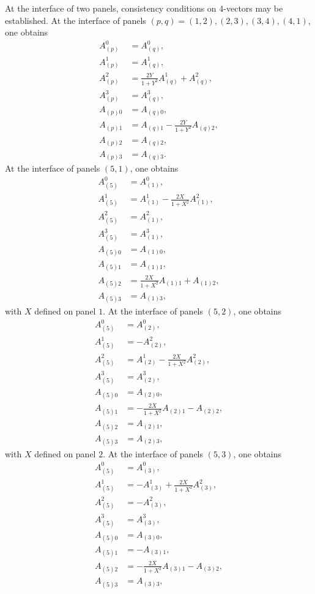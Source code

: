 \documentclass{article}
\begin{document}
At the interface of two panels, consistency conditions on 4-vectors may be established. At the interface of panels $(p,q)=(1,2), (2,3),(3,4),(4,1)$, one obtains
\begin{align}
A^0_{(p)}&=A^0_{(q)}, \\
A^1_{(p)}&=A^1_{(q)}, \\
A^2_{(p)}&=\frac{2Y}{1+Y^2} A^1_{(q)} + A^2_{(q)}, \\
A^3_{(p)}&=A^3_{(q)}, \\
A_{(p)0}&=A_{(q)0}, \\
A_{(p)1}&=A_{(q)1}-\frac{2Y}{1+Y^2} A_{(q)2}, \\
A_{(p)2}&=A_{(q)2}, \\
A_{(p)3}&=A_{(q)3}.
\end{align}
At the interface of panels $(5,1)$, one obtains
\begin{align}
A^0_{(5)}&=A^0_{(1)}, \\
A^1_{(5)}&=A^1_{(1)}-\frac{2X}{1+X^2} A^2_{(1)}, \\
A^2_{(5)}&=A^2_{(1)}, \\
A^3_{(5)}&=A^3_{(1)}, \\
A_{(5)0}&=A_{(1)0}, \\
A_{(5)1}&=A_{(1)1}, \\
A_{(5)2}&=\frac{2X}{1+X^2}A_{(1)1} + A_{(1)2}, \\
A_{(5)3}&=A_{(1)3},
\end{align}
with $X$ defined on panel $1$. At the interface of panels $(5,2)$, one obtains
\begin{align}
A^0_{(5)}&=A^0_{(2)}, \\
A^1_{(5)}&=-A^2_{(2)}, \\
A^2_{(5)}&=A^1_{(2)}-\frac{2X}{1+X^2} A^2_{(2)}, \\
A^3_{(5)}&=A^3_{(2)}, \\
A_{(5)0}&=A_{(2)0}, \\
A_{(5)1}&=-\frac{2X}{1+X^2} A_{(2)1} - A_{(2)2}, \\
A_{(5)2}&=A_{(2)1}, \\
A_{(5)3}&=A_{(2)3},
\end{align}
with $X$ defined on panel $2$. At the interface of panels $(5,3)$, one obtains
\begin{align}
A^0_{(5)}&=A^0_{(3)}, \\
A^1_{(5)}&=- A^1_{(3)} + \frac{2X}{1+X^2} A^2_{(3)}, \\
A^2_{(5)}&=-A^2_{(3)}, \\
A^3_{(5)}&=A^3_{(3)}, \\
A_{(5)0}&=A_{(3)0}, \\
A_{(5)1}&=-A_{(3)1}, \\
A_{(5)2}&=-\frac{2X}{1+X^2} A_{(3)1} - A_{(3)2}, \\
A_{(5)3}&=A_{(3)3},
\end{align}
\end{document}
